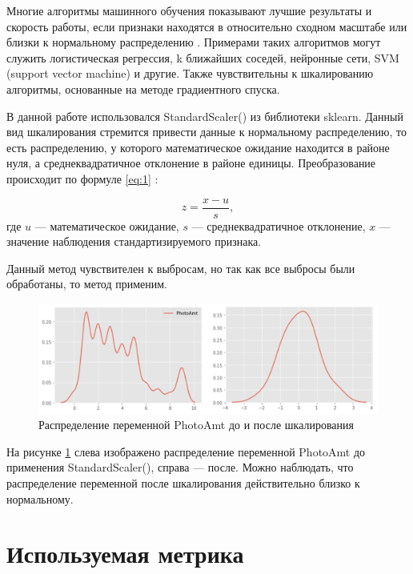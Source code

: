 \documentclass[14pt]{mmcs_article}
\begin{document}
Многие алгоритмы машинного обучения показывают лучшие результаты и скорость работы, если признаки находятся в относительно сходном масштабе или близки к нормальному распределению \cite{lib:standardize}.  Примерами таких алгоритмов могут служить логистическая регрессия, k ближайших соседей, нейронные сети, SVM (support vector machine) и другие. Также чувствительны к шкалированию алгоритмы, основанные на методе градиентного спуска.

В данной работе использовался StandardScaler() из библиотеки sklearn. Данный вид шкалирования стремится привести данные к нормальному распределению, то есть распределению, у которого математическое ожидание находится в районе нуля, а среднеквадратичное отклонение в районе единицы. Преобразование происходит по формуле \ref{eq:1} \cite{lib:sklearnstandard}:

\begin{equation}\label{eq:1}
	z = \frac{x-u}{s},
\end{equation}
где $u$ --- математическое ожидание, $s$ --- среднеквадратичное отклонение, $x$ --- значение наблюдения стандартизируемого признака.

Данный метод чувствителен к выбросам, но так как все выбросы были обработаны, то метод применим.

\begin{figure}[H]
	\centering
	\includegraphics[scale=0.4]{photoamt.png}
	\caption{Распределение переменной PhotoAmt до и после шкалирования}\label{analyse:photoamt}
\end{figure}

На рисунке \ref{analyse:photoamt} слева изображено распределение переменной PhotoAmt до применения StandardScaler(), справа --- после. Можно наблюдать, что распределение переменной после шкалирования действительно близко к нормальному.

\newpage
\section{Используемая метрика}
\end{document}
